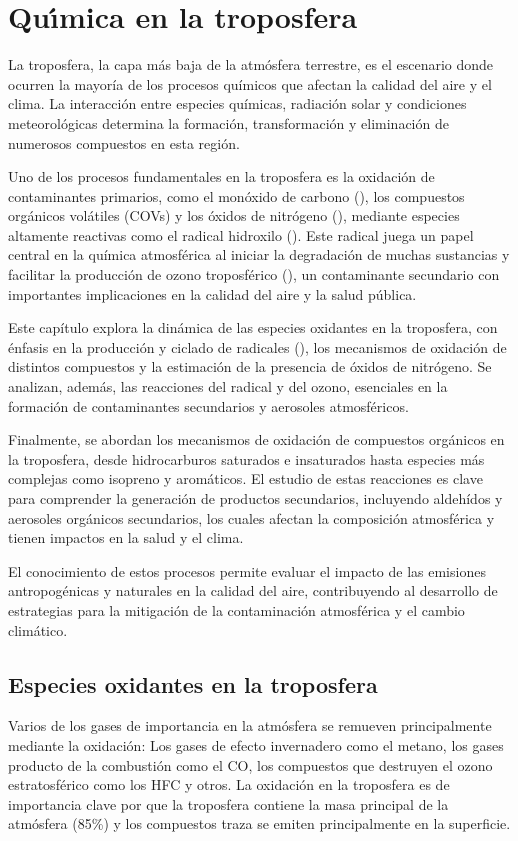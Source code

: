 %  
%  

\chapter[Quimica en la Troposfera]{Qu\'{\i}mica en la troposfera}
La troposfera, la capa más baja de la atmósfera terrestre, es el escenario donde ocurren la mayoría de los procesos químicos que afectan la calidad del aire y el clima. La interacción entre especies químicas, radiación solar y condiciones meteorológicas determina la formación, transformación y eliminación de numerosos compuestos en esta región.  

Uno de los procesos fundamentales en la troposfera es la oxidación de contaminantes primarios, como el monóxido de carbono (), los compuestos orgánicos volátiles (COVs) y los óxidos de nitrógeno (), mediante especies altamente reactivas como el radical hidroxilo (). Este radical juega un papel central en la química atmosférica al iniciar la degradación de muchas sustancias y facilitar la producción de ozono troposférico (), un contaminante secundario con importantes implicaciones en la calidad del aire y la salud pública.

Este capítulo explora la dinámica de las especies oxidantes en la troposfera, con énfasis en la producción y ciclado de radicales (), los mecanismos de oxidación de distintos compuestos y la estimación de la presencia de óxidos de nitrógeno. Se analizan, además, las reacciones del radical  y del ozono, esenciales en la formación de contaminantes secundarios y aerosoles atmosféricos.

Finalmente, se abordan los mecanismos de oxidación de compuestos orgánicos en la troposfera, desde hidrocarburos saturados e insaturados hasta especies más complejas como isopreno y aromáticos. El estudio de estas reacciones es clave para comprender la generación de productos secundarios, incluyendo aldehídos y aerosoles orgánicos secundarios, los cuales afectan la composición atmosférica y tienen impactos en la salud y el clima.

El conocimiento de estos procesos permite evaluar el impacto de las emisiones antropogénicas y naturales en la calidad del aire, contribuyendo al desarrollo de estrategias para la mitigación de la contaminación atmosférica y el cambio climático.

\section{Especies oxidantes en la troposfera}
Varios de los gases de importancia en la atmósfera se remueven principalmente mediante la oxidación: Los gases de efecto invernadero como el metano, los gases producto de la combustión como el CO, los compuestos que destruyen el ozono estratosférico como los HFC y otros. La oxidación en la troposfera es de importancia clave por que la troposfera contiene la masa principal de la atmósfera (85\%) y los compuestos traza se emiten principalmente en la superficie.

